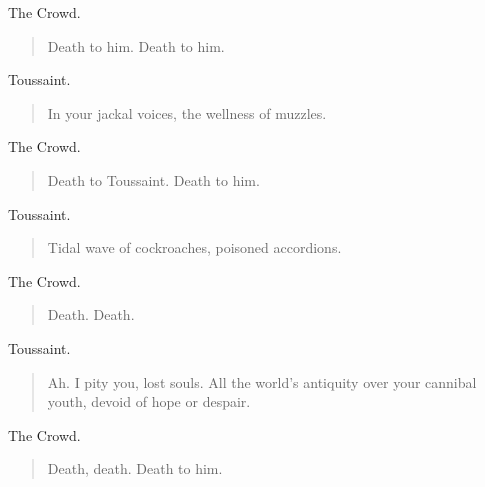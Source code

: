 \documentclass[letterpaper,article,12pt,oneside,notitlepage]{memoir}
\begin{document}
\begin{center}The Crowd.\end{center}

\begin{verse}
Death to him. Death to him. \\
\end{verse}

\begin{center}Toussaint.\end{center}

\begin{verse}
In your jackal voices, the wellness of muzzles. \\
\end{verse}

\begin{center}The Crowd.\end{center}

\begin{verse}
Death to Toussaint. Death to him. \\
\end{verse}

\begin{center}Toussaint.\end{center}

\begin{verse}
Tidal wave of cockroaches, poisoned accordions. \\
\end{verse}

\begin{center}The Crowd.\end{center}

\begin{verse}
Death. Death. \\
\end{verse}

\begin{center}Toussaint.\end{center}

\begin{verse}
\indent Ah. I pity you, lost souls. All the world's antiquity over your cannibal youth, devoid of hope or despair. \\
\end{verse}

\begin{center}The Crowd.\end{center}

\begin{verse}
\hspace{1cm} Death, death. Death to him. \\
\end{verse}
\end{document}
